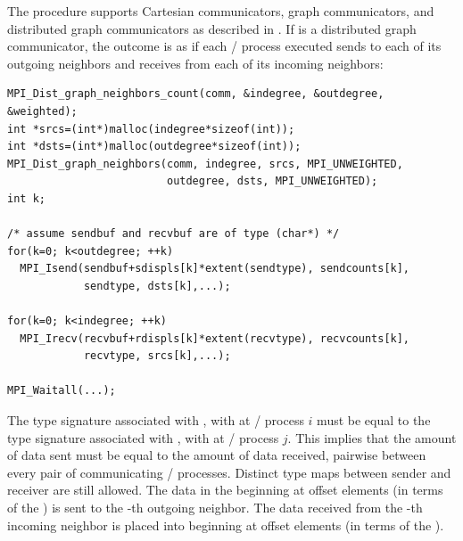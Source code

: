 
\begin{sloppy}
The  procedure supports Cartesian communicators, graph communicators, and
distributed graph communicators as described
in .
If  is a distributed graph communicator, the outcome is as if each
\MPI/ process executed sends to each of its outgoing neighbors and receives from
each of its incoming neighbors:

\end{sloppy}
\begin{lstlisting}[language={[MPI]C}]
MPI_Dist_graph_neighbors_count(comm, &indegree, &outdegree, &weighted);
int *srcs=(int*)malloc(indegree*sizeof(int));
int *dsts=(int*)malloc(outdegree*sizeof(int));
MPI_Dist_graph_neighbors(comm, indegree, srcs, MPI_UNWEIGHTED,
                         outdegree, dsts, MPI_UNWEIGHTED);
int k;

/* assume sendbuf and recvbuf are of type (char*) */
for(k=0; k<outdegree; ++k)
  MPI_Isend(sendbuf+sdispls[k]*extent(sendtype), sendcounts[k],
            sendtype, dsts[k],...);

for(k=0; k<indegree; ++k)
  MPI_Irecv(recvbuf+rdispls[k]*extent(recvtype), recvcounts[k],
            recvtype, srcs[k],...);

MPI_Waitall(...);
\end{lstlisting}

The type signature associated with
\mpicode{[k]}, 
with  at \MPI/ process $i$
must be equal to the type signature associated with
\mpicode{[l]}, 
with  at \MPI/ process $j$.
This implies that the amount of data sent must be equal to the
amount of data received, pairwise between every pair of
communicating \MPI/ processes.
Distinct type maps between sender and receiver are still allowed.
The data in the  beginning at offset 
\mpicode{[k]} elements (in terms of the ) 
is sent to the -th outgoing neighbor.
The data received from the -th incoming neighbor is placed
into  beginning at offset \mpicode{[l]}
elements (in terms of the ). 
 
